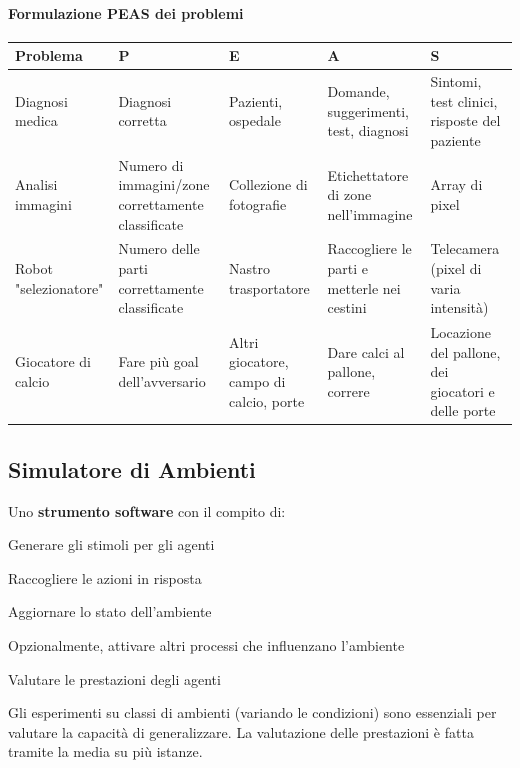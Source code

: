 \documentclass[10pt]{book}
\begin{document}
\paragraph{Formulazione PEAS dei problemi}
\begin{center}
	\begin{tabular}{p{3cm} | p{3cm} | p{3cm} | p{3cm} | p{3cm}}
		\textbf{Problema} & \textbf{P} & \textbf{E} & \textbf{A} & \textbf{S} \\
		\hline
		Diagnosi medica & Diagnosi corretta & Pazienti, ospedale & Domande, suggerimenti, test, diagnosi & Sintomi, test clinici, risposte del paziente \\
		\hline
		Analisi immagini & Numero di immagini/zone correttamente classificate & Collezione di fotografie & Etichettatore di zone nell'immagine & Array di pixel \\
		\hline
		Robot "selezionatore" & Numero delle parti correttamente classificate & Nastro trasportatore & Raccogliere le parti e metterle nei cestini & Telecamera (pixel di varia intensità) \\
		\hline
		Giocatore di calcio & Fare più goal dell'avversario & Altri giocatore, campo di calcio, porte & Dare calci al pallone, correre & Locazione del pallone, dei giocatori e delle porte
	\end{tabular}
\end{center}
\subsection{Simulatore di Ambienti}
Uno \textbf{strumento software} con il compito di:
\begin{list}{}{}
	\item Generare gli stimoli per gli agenti
	\item Raccogliere le azioni in risposta
	\item Aggiornare lo stato dell'ambiente
	\item Opzionalmente, attivare altri processi che influenzano l'ambiente
	\item Valutare le prestazioni degli agenti
\end{list}
Gli esperimenti su classi di ambienti (variando le condizioni) sono essenziali per valutare la capacità di generalizzare. La valutazione delle prestazioni è fatta tramite la media su più istanze.
\pagebreak
\end{document}
